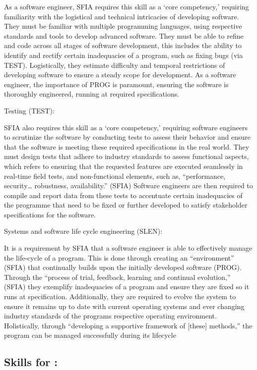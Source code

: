 \documentclass[a4paper, 11pt]{report}
\begin{document}
As a software engineer, SFIA requires this skill as a ‘core competency,’ requiring familiarity with the logistical and technical intricacies of developing software. They must be familiar with multiple programming languages, using respective standards and tools to develop advanced software. They must be able to refine and code across all stages of software development, this includes the ability to identify and rectify certain inadequacies of a program, such as fixing bugs (via TEST). Logistically, they estimate difficulty and temporal restrictions of developing software to ensure a steady scope for development. As a software engineer, the importance of PROG is paramount, ensuring the software is thoroughly engineered, running at required specifications.

Testing (TEST): 

SFIA also requires this skill as a ‘core competency,’ requiring software engineers to scrutinize the software by conducting tests to assess their behavior and ensure that the software is meeting these required specifications in the real world. They must design tests that adhere to industry standards to assess functional aspects, which refers to ensuring that the requested features are executed seamlessly in real-time field tests, and non-functional elements, such as, “performance, security… robustness, availability.” (SFIA) Software engineers are then required to compile and report data from these tests to accentuate certain inadequacies of the programme that need to be fixed or further developed to satisfy stakeholder specifications for the software.

Systems and software life cycle engineering (SLEN): 

It is a requirement by SFIA that a software engineer is able to effectively manage the life-cycle of a program. This is done through creating an “environment” (SFIA) that continually builds upon the initially developed software (PROG). Through the “process of trial, feedback, learning and continual evolution,” (SFIA) they exemplify inadequacies of a program and ensure they are fixed so it runs at specification. Additionally, they are required to evolve the system to ensure it remains up to date with current operating systems and ever changing industry standards of the programs respective operating environment. Holistically, through “developing a supportive framework of [these] methods,” the program can be managed successfully during its lifecycle


\subsection{Skills for \majD: \studD}
\end{document}
